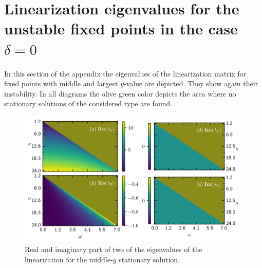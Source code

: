     \section{Linearization eigenvalues for the unstable fixed points in the case $\delta=0$}
    \label{appendix:eig_del0}
    In this section of the appendix the eigenvalues of the linearization matrix for fixed points with middle and largest $y$-value are depicted. They show again their instability. In all diagrams the olive green color depicts the area where no stationary solutions of the considered type are found.
    \begin{figure}[H]
        \centering
        \includegraphics{pictures/lam_anal_m1.png}
        \caption{Real and imaginary part of two of the eigenvalues of the linearization for the middle-$y$ stationary solution.
        }
    \end{figure}
    
